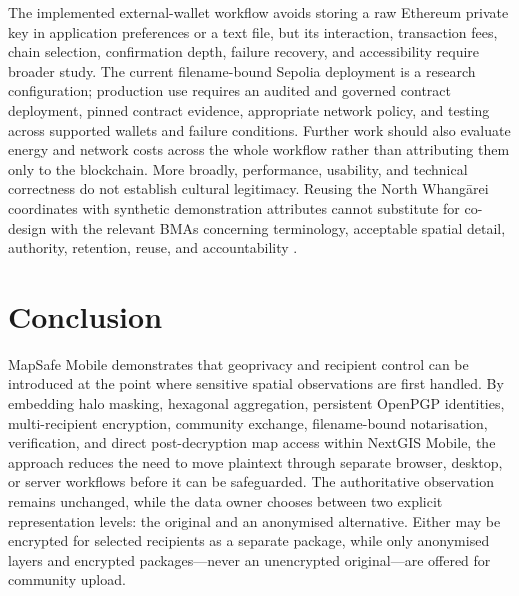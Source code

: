 \documentclass[a4paper,UKenglish,cleveref,autoref,thm-restate]{lipics-v2021}
\begin{document}
The implemented external-wallet workflow avoids storing a raw Ethereum private key in application preferences or a text file, but its interaction, transaction fees, chain selection, confirmation depth, failure recovery, and accessibility require broader study. The current filename-bound Sepolia deployment is a research configuration; production use requires an audited and governed contract deployment, pinned contract evidence, appropriate network policy, and testing across supported wallets and failure conditions. Further work should also evaluate energy and network costs across the whole workflow rather than attributing them only to the blockchain. More broadly, performance, usability, and technical correctness do not establish cultural legitimacy. Reusing the North Whangārei coordinates with synthetic demonstration attributes cannot substitute for co-design with the relevant BMAs concerning terminology, acceptable spatial detail, authority, retention, reuse, and accountability \citep{kukutai2016indigenous,lovett2019gooddata,carroll2020care,jennings2023care,reyesgarcia2022}.

\section{Conclusion}
\label{sec:conclusion}

MapSafe Mobile demonstrates that geoprivacy and recipient control can be introduced at the point where sensitive spatial observations are first handled. By embedding halo masking, hexagonal aggregation, persistent OpenPGP identities, multi-recipient encryption, community exchange, filename-bound notarisation, verification, and direct post-decryption map access within NextGIS Mobile, the approach reduces the need to move plaintext through separate browser, desktop, or server workflows before it can be safeguarded. The authoritative observation remains unchanged, while the data owner chooses between two explicit representation levels: the original and an anonymised alternative. Either may be encrypted for selected recipients as a separate package, while only anonymised layers and encrypted packages---never an unencrypted original---are offered for community upload.
\end{document}
